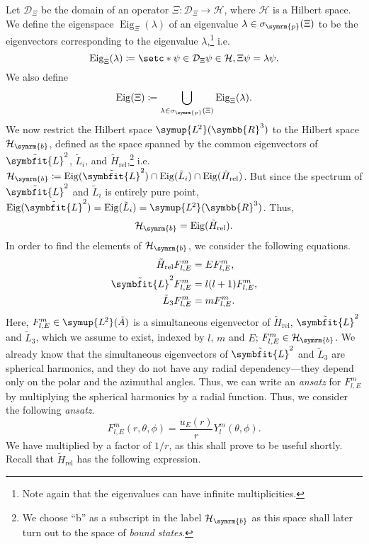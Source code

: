 \documentclass[12pt, a4 paper]{article}
\let\symcal\mathcal
\theoremstyle{definition}
\newcommand{\ltwo}{\symup{L\kern-0.5pt^2}}
\newcommand{\ltworthree}{\ltwo(\rr^3)}
\newcommand{\rr}{\symbb{R}}
\newcommand{\cc}{\symbb{C}}
\newcommand{\nn}{\symbb{N}_0}
\newcommand{\hilbert}{\symcal{H}}
\newcommand{\domain}{\symcal{D}}
\newcommand{\spec}{\sigma}
\newcommand{\lvecsquare}{\tilde{\symbfit{L}}^2}
\DeclareMathOperator{\spann}{span}
\newcommand{\hrel}{\tilde{H}_\text{rel}}
\newcommand{\lthree}{\tilde{L}_3}
\newcommand{\flme}{F^m_{l,E}}
\newcommand{\bhilbert}{\hilbert_{\symrm{b}}}
\newcommand{\eigen}{\operatorname{Eig}}
\newcommand{\ltwoa}{\ltwo(\tilde{A})}
\newcommand{\sphe}{Y_l^m}
\begin{document}
    Let \(\domain_{\Xi}\) be the domain of an operator \(\Xi \colon \domain_{\Xi} \rightarrow \hilbert\), where \(\hilbert\) is a Hilbert space. We define the eigenspace \(\eigen_{\Xi}(\lambda)\) of an eigenvalue \(\lambda \in \spec_{\symrm{p}}(\Xi)\) to be the eigenvectors corresponding to the eigenvalue \(\lambda\),\footnote{Note again that the eigenvalues can have infinite multiplicities.} i.e.
    \[
        \eigen_{\Xi}(\lambda) \coloneq \setc*{\psi \in \domain_{\Xi}}{\psi \in \hilbert, \Xi\psi = \lambda\psi}.
    \]
    We also define
    \[
        \eigen(\Xi) \coloneq \bigcup_{\lambda \in \spec_{\symrm{p}}(\Xi)} \eigen_{\Xi}(\lambda).
    \]
    We now restrict the Hilbert space \(\ltworthree\) to the Hilbert space \(\bhilbert\), defined as the space spanned by the common eigenvectors of \(\lvecsquare\), \(\tilde{L}_i\), and \(\hrel\),\footnote{We choose ``b'' as a subscript in the label \(\bhilbert\) as this space shall later turn out to the space of \textit{bound states}.} i.e.\ \(\bhilbert \coloneq \eigen(\lvecsquare) \cap \eigen(\tilde{L}_i) \cap \eigen(\hrel)\). But since the spectrum of \(\lvecsquare\) and \(\tilde{L}_i\) is entirely pure point, \(\eigen(\lvecsquare) = \eigen(\tilde{L}_i) = \ltworthree\). Thus, \[\bhilbert = \eigen(\hrel).\] In order to find the elements of \(\bhilbert\), we consider the following equations.
    \begin{align*}
        \hrel \flme &= E \flme,\\
        \lvecsquare \flme &= l(l+1) \flme,\\
        \lthree \flme &= m \flme.
    \end{align*}
    Here, \(\flme \in \ltwoa\) is a simultaneous eigenvector of \(\hrel\), \(\lvecsquare\) and \(\lthree\), which we assume to exist, indexed by \(l\), \(m\) and \(E\); \(\flme \in \bhilbert\). We already know that the simultaneous eigenvectors of \(\lvecsquare\) and \(\lthree\) are spherical harmonics, and they do not have any radial dependency---they depend only on the polar and the azimuthal angles. Thus, we can write an \textit{ansatz} for \(\flme\) by multiplying the spherical harmonics by a radial function. Thus, we consider the following \textit{ansatz}.
    \[
        \flme(r, \theta, \phi) = \frac{u_E(r)}{r}\sphe(\theta, \phi).
    \]
    We have multiplied by a factor of \(1/r\), as this shall prove to be useful shortly. Recall that \(\hrel\) has the following expression.
\end{document}
